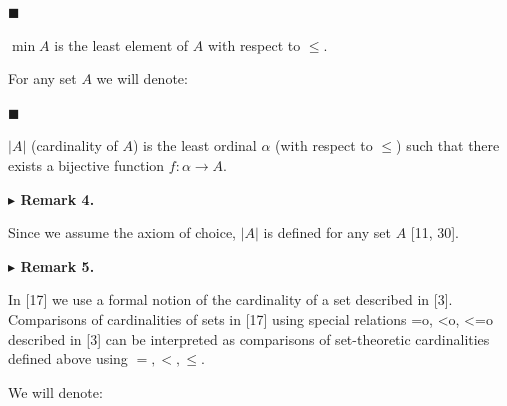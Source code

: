 \documentclass[10pt,a4paper]{amsart}
\begin{document}
 
 
\par\noindent  $\blacksquare$ 
 
$\min A$ is the least element of $A$ with respect to $\leq$.\par
 
 
  
 
 
For any set $A$ we will denote:\par
  
\par\noindent  $\blacksquare$ 
 
$|A|$ (cardinality of $A$) is the least ordinal $\alpha$ (with respect to $\leq$) such that there exists a bijective function $f:\alpha\to A$.\par
 
 
  
 
 
\par\medskip\noindent\textbf{$\blacktriangleright$ Remark 4.}\par
 
 
Since we assume the axiom of choice, $|A|$ is defined for any set $A$ [11, 30].\par
 
 
 
 
\par\medskip\noindent\textbf{$\blacktriangleright$ Remark 5.}\par
 
 
In [17] we use a formal notion of the cardinality of a set described in [3]. Comparisons of cardinalities of sets in [17] using special relations =o, <o, <=o described in [3] can be interpreted as comparisons of set-theoretic cardinalities defined above using $=,<,\leq$.\par
 
 
 
 
We will denote:\par
  
\end{document}
